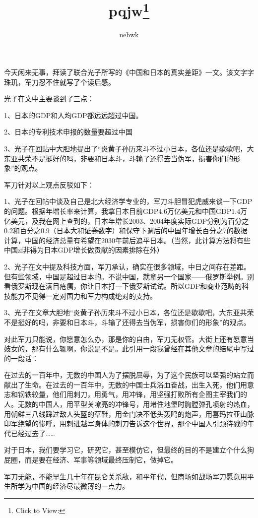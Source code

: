 \documentclass{article}
\title{pqjw\footnote{Click to View:\url{}}}
\author{nebwk}
\date{}
\begin{document}



\Large

今天闲来无事，拜读了联合光子所写的《中国和日本的真实差距》一文。该文字字珠玑，军刀忍不住就写了个读后感。

光子在文中主要谈到了三点：

1、日本的GDP和人均GDP都远远超过中国。

2、日本的专利技术申报的数量要超过中国

3、光子在回贴中大胆地提出了“炎黄子孙历来斗不过小日本，各位还是歇歇吧，大东亚共荣不是挺好的吗，非要和日本斗，斗输了还得去当伪军，损害你们的形象”的观点。

军刀针对以上观点反驳如下：

1、光子在回帖中谈及自己是北大经济学专业的，军刀斗胆冒犯虎威来谈一下GDP的问题。根据年增长率来计算，我拿日本目前GDP4.6万亿美元和中国GDP1.4万亿美元，及我在网上查到的，日本年增长2003、2004年度实际GDP分别为百分之0.2和百分之0.9（日本大和证券数字）和保守下调后的中国年增长百分之7的数据计算，中国的经济总量有希望在2030年前后追平日本。（当然，此计算方法将有些中国zf非得为日本GDP增长做贡献的因素排除在外）

2、光子在文中提及科技方面，军刀承认，确实在很多领域，中日之间存在差距。但有些领域，中国是超过日本的。不说中国，就拿另一个国家——俄罗斯举例。别看俄罗斯现在满目疮痍，你让日本打一下俄罗斯试试。所以GDP和商业范畴的科技能力不见得一定对国力和军力构成绝对的支持。

3、光子在文章大胆地“炎黄子孙历来斗不过小日本，各位还是歇歇吧，大东亚共荣不是挺好的吗，非要和日本斗，斗输了还得去当伪军，损害你们的形象”的观点。

对此军刀只能说，你愿意怎么办，那是你的自由，军刀无权管。大街上还有愿意当妓女的，那有什么辄啊，你说是不是。此引用一段我曾经在其他文章的结尾中写过的一段话：

在过去的一百年中，无数的中国人为了摆脱屈辱，为了这个民族可以坚强的站立而献出了生命。在过去的一百年中，无数的中国士兵浴血奋战，出生入死，他们用意志和钢铁较量，他们用刺刀，用勇气，用冲锋，用坚强打败所有企图主宰我们的人。无数的中国人，用平型关嘹亮的冲锋号，用堵住地堡时胸膛弹孔喷射的热血，用朝鲜三八线踩过敌人头盔的草鞋，用金门决不低头轰鸣的炮声，用喜玛拉亚山脉印军绝望的惨呼，用刺进越军身体的刺刀告诉这个世界，那个中国人引颈待戮的年代已经过去了……

对于日本，我们要学习它，研究它，甚至模仿它，但最终的目的不是建立个什么狗屁圈，而是要在经济、军事等领域最终压制它，做掉它。

军刀无能，不能早生几十年在昆仑关杀敌，和平年代，但商场如战场军刀愿意用平生所学为中国的经济尽最微薄的一点力。
\end{document}
